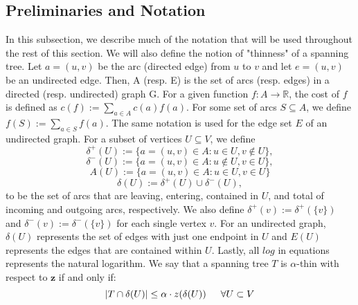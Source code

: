 \documentclass[oneside]{projectpaper} %
\begin{document}
\subsection{Preliminaries and Notation}
In this subsection, we describe much of the notation that will be used throughout the rest of this section. We will also define the notion of "thinness" of a spanning tree. \newline
\indent Let $a = (u, v)$ be the arc (directed edge) from $u$ to $v$ and let $e = (u, v)$ be an undirected edge. Then, A (resp. E) is the set of arcs (resp. edges) in a directed (resp. undirected) graph G. \newline
\indent For a given function $f : A \rightarrow \mathbb{R}$, the cost of $f$ is defined as $c(f) := \sum\limits_{a \in A}c(a)f(a)$. For some set of arcs $S \subseteq A$, we define $f(S) := \sum\limits_{a \in S}f(a)$. The same notation is used for the edge set $E$ of an undirected graph. \newline
\indent For a subset of vertices $U \subseteq V$, we define
\begin{equation*}
  \delta^{+}(U) := \{a = (u, v) \in A : u \in U, v \notin U\},
\end{equation*}
\begin{equation*}
  \delta^{-}(U) := \{a = (u, v) \in A : u \notin U, v \in U\},
\end{equation*}
\begin{equation*}
  A(U) := \{a = (u, v) \in A : u \in U, v \in U\}
\end{equation*}
\begin{equation*}
  \delta(U) := \delta^{+}(U) \cup \delta^{-}(U),
\end{equation*}
to be the set of arcs that are leaving, entering, contained in $U$, and total of incoming and outgoing arcs, respectively. We also define $\delta^{+}(v) :=\delta^{+}(\{v\})$ and $\delta^{-}(v) :=\delta^{-}(\{v\})$ for each single vertex $v$. For an undirected graph, $\delta(U)$ represents the set of edges with just one endpoint in $U$ and $E(U)$ represents the edges that are contained within $U$. Lastly, all $log$ in equations represents the natural logarithm. \newline
\indent We say that a spanning tree $T$ is $\alpha$-thin with respect to $\textbf{z}$  if and only if: 
\begin{equation*}
|T \cap \delta(U)| \leq \alpha \cdot z(\delta(U)) \indent \forall U \subset V
\end{equation*}
\end{document}

